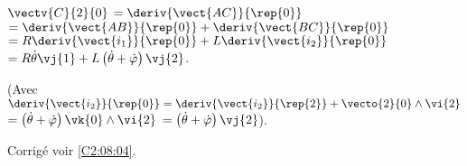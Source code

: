 $\vectv{C}{2}{0}$ $ = \deriv{\vect{AC}}{\rep{0}}$
$ = \deriv{\vect{AB}}{\rep{0}}+\deriv{\vect{BC}}{\rep{0}}$
$ = R\deriv{\vect{i_1}}{\rep{0}}+L\deriv{\vect{i_2}}{\rep{0}}$
$ = R\dot{\theta}\vj{1}+L\left( \dot{\theta}+\dot{\varphi}\right)\vj{2}$.

(Avec $\deriv{\vect{i_2}}{\rep{0}} = \deriv{\vect{i_2}}{\rep{2}} + \vecto{2}{0}\wedge \vi{2}$
$ = \left( \dot{\theta}+\dot{\varphi}\right)\vk{0}\wedge \vi{2}$ $ = \left( \dot{\theta}+\dot{\varphi}\right)\vj{2}$).

\else
\fi

\ifprof
\else
\fi

\ifcolle
{}
\else
\fi


\ifprof
\else
\begin{flushright}
\footnotesize{Corrigé  voir \ref{C2:08:04}.}
\end{flushright}%
\fi